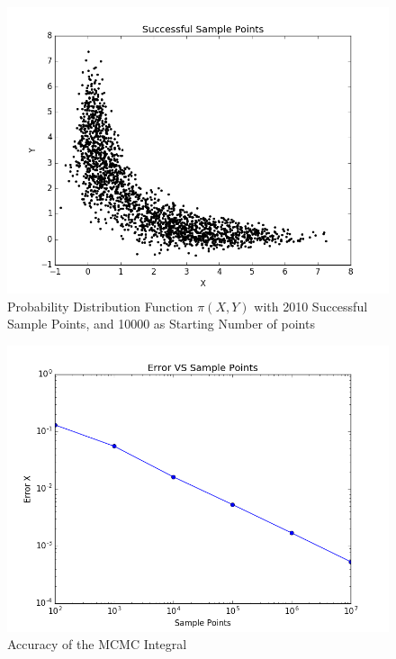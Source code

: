 \documentclass[a4paper]{article}
\begin{document}
\begin{figure}
\centering
\includegraphics[scale=.5]{Pxy.png}
\caption{Probability Distribution Function $\pi(X,Y)$ with 2010 Successful Sample Points, and 10000 as Starting Number of points}
\end{figure}


\begin{figure}
\centering
\includegraphics[scale=.5]{Error.png}
\caption{Accuracy of the MCMC Integral}
\end{figure}
\end{document}
